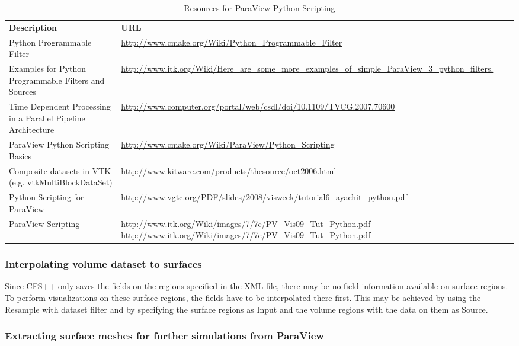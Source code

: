 \begin{table}[htb]
\centering
\begin{minipage}{18cc}\caption{Resources for ParaView Python Scripting}
\label{tab:pv_python_scripting}
\end{minipage}
\par\medskip\noindent
\begin{tabular}{ll}
  \toprule
  {\bf Description} & {\bf URL} \\ \otoprule
  Python Programmable Filter & \url{http://www.cmake.org/Wiki/Python\_Programmable\_Filter} \\
  Examples for Python Programmable Filters and Sources & \url{http://www.itk.org/Wiki/Here\_are\_some\_more\_examples\_of\_simple\_ParaView\_3\_python\_filters.} \\
  Time Dependent Processing in a Parallel Pipeline Architecture \cite{Biddiscombe2007} & \url{http://www.computer.org/portal/web/csdl/doi/10.1109/TVCG.2007.70600} \\
  ParaView Python Scripting Basics & \url{http://www.cmake.org/Wiki/ParaView/Python\_Scripting} \\
  Composite datasets in VTK (e.g. vtkMultiBlockDataSet) \cite{Geveci2006} & \url{http://www.kitware.com/products/thesource/oct2006.html} \\
  Python Scripting for ParaView & \url{http://www.vgtc.org/PDF/slides/2008/visweek/tutorial6_ayachit_python.pdf} \\
  ParaView Scripting & \url{http://www.itk.org/Wiki/images/7/7c/PV_Vis09_Tut_Python.pdf} \url{http://www.itk.org/Wiki/images/7/7c/PV_Vis09_Tut_Python.pdf} \\
  \bottomrule
\end{tabular} 
\end{table}

\subsubsection{Interpolating volume dataset to surfaces}

Since CFS++  only saves the fields on  the regions specified in  the XML file,
there may  be no field information  available on surface  regions.  To perform
visualizations on  these surface regions,  the fields have to  be interpolated
there first.  This may be achieved  by using the Resample  with dataset filter
and by specifying the surface regions as Input and the volume regions with the
data on them as Source.

\subsubsection{Extracting surface meshes for further simulations from ParaView}

